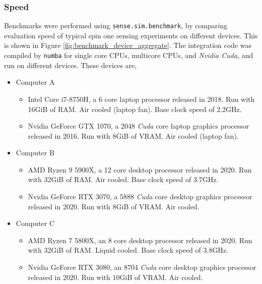 \documentclass{jors}
\begin{document}
		\subsubsection*{Speed}
			Benchmarks were performed using \texttt{sense.sim.benchmark}, by comparing evaluation speed of typical spin one sensing experiments on different devices. This is shown in Figure \ref{fig:benchmark_device_aggregate}. The integration code was compiled by \texttt{numba} for single core CPUs, multicore CPUs, and \emph{Nvidia Cuda}, and run on different devices. These devices are,
			\begin{itemize}
				\item{
					Computer A\begin{itemize}
						\item Intel Core i7-8750H, a 6 core laptop processor released in 2018. Run with 16GiB of RAM. Air cooled (laptop fan). Base clock speed of 2.2GHz.
						\item Nvidia GeForce GTX 1070, a 2048 \emph{Cuda} core laptop graphics processor released in 2016. Run with 8GiB of VRAM. Air cooled (laptop fan).
					\end{itemize}
				}

				\item{Computer B\begin{itemize}
						\item AMD Ryzen 9 5900X, a 12 core desktop processor released in 2020. Run with 32GiB of RAM. Air cooled. Base clock speed of 3.7GHz.
						\item Nvidia GeForce RTX 3070, a 5888 \emph{Cuda} core desktop graphics processor released in 2020. Run with 8GiB of VRAM. Air cooled.
					\end{itemize}
				}

				\item{Computer C\begin{itemize}
						\item AMD Ryzen 7 5800X, an 8 core desktop processor released in 2020. Run with 32GiB of RAM. Liquid cooled. Base clock speed of 3.8GHz.
						\item Nvidia GeForce RTX 3080, an 8704 \emph{Cuda} core desktop graphics processor released in 2020. Run with 10GiB of VRAM. Air cooled.
					\end{itemize}
				}
			\end{itemize}
\end{document}
